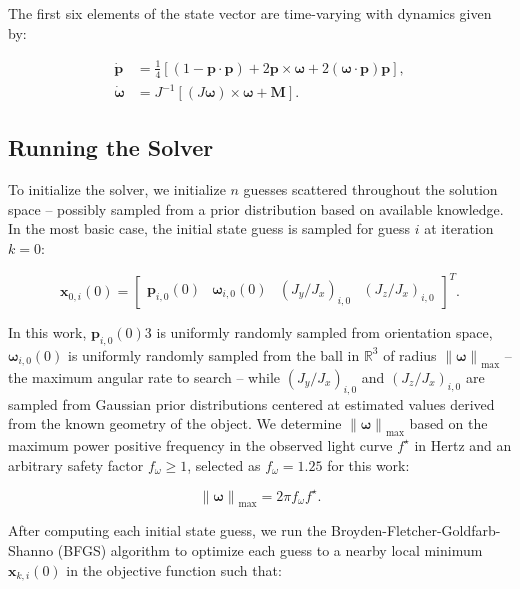 \documentclass[a4paper,twocolumn]{spaceDebrisC} %
\newcommand{\vctr}[1]{\bm{#1}}
\newcommand{\norm}[1]{\left\lVert#1\right\rVert}
\begin{document}
The first six elements of the state vector are time-varying with dynamics given by:

\begin{align}
 \vctr{\dot{p}} &= \frac{1}{4} \left[ \left(1 - \vctr{p} \cdot \vctr{p}\right) + 2\vctr{p} \times \vctr{\omega} + 2 \left(\vctr{\omega} \cdot \vctr{p} \right)\vctr{p} \right], \label{eq:mrp_kde} \\
 \vctr{\dot{\omega}} &= J^{-1} \left[ \left(J \vctr{\omega}\right) \times \vctr{\omega} + \vctr{M}\right]. \label{eq:rbtf_dynamics}
\end{align}

\subsection{Running the Solver} \label{sec:run_solver}

To initialize the solver, we initialize $n$ guesses scattered throughout the solution space -- possibly sampled from a prior distribution based on available knowledge. In the most basic case, the initial state guess is sampled for guess $i$ at iteration $k=0$:

\begin{equation}
 \vctr{x}_{0,i}(0) = \begin{bmatrix}\vctr{p}_{i,0}(0) & \vctr{\omega}_{i,0}(0) & \left(J_y / J_x\right)_{i,0} & \left(J_z / J_x\right)_{i,0}\end{bmatrix}^T.
\end{equation}

\noindent
In this work, $\vctr{p}_{i,0}(0)3$ is uniformly randomly sampled from orientation space, $\vctr{\omega}_{i,0}(0)$ is uniformly randomly sampled from the ball in $\mathbb{R}^3$ of radius $\norm{\vctr{\omega}}_\text{max}$ -- the maximum angular rate to search -- while $\left(J_y / J_x\right)_{i,0}$ and $\left(J_z / J_x\right)_{i,0}$ are sampled from Gaussian prior distributions centered at estimated values derived from the known geometry of the object. We determine $\norm{\vctr{\omega}}_\text{max}$ based on the maximum power positive frequency in the observed light curve $f^\star$ in Hertz and an arbitrary safety factor $f_\omega \geq 1$, selected as $f_\omega = 1.25$ for this work:

\begin{equation} \label{eq:ang_vel_max}
  \norm{\vctr{\omega}}_\text{max} = 2\pi f_\omega f^\star.
\end{equation}

After computing each initial state guess, we run the Broyden-Fletcher-Goldfarb-Shanno (BFGS) algorithm \cite{broyden1970, fletcher1970, goldfarb1970, shanno1970} to optimize each guess to a nearby local minimum $\vctr{x}_{k,i}(0)$ in the objective function such that:
\end{document}
